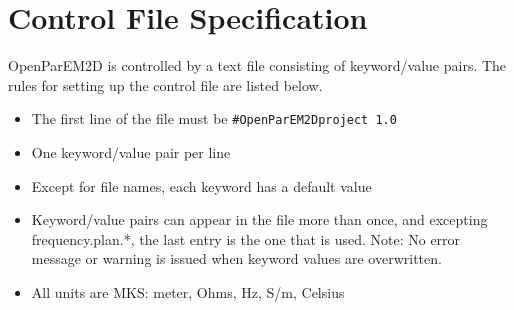 \documentclass[titlepage]{article}
\renewcommand\_{\textunderscore\linebreak[1]}
\begin{document}
\appendix

\newpage
\section{Control File Specification}
\label{sec:control_file_spec}

OpenParEM2D is controlled by a text file consisting of keyword/value pairs.  The rules for setting up the control file are listed below.
\begin{itemize}[nosep]
  \item The first line of the file must be \verb+#OpenParEM2Dproject 1.0+
  \item One keyword/value pair per line
  \item Except for file names, each keyword has a default value
  \item Keyword/value pairs can appear in the file more than once, and excepting frequency.plan.*, the last entry is the one that is used.  Note: No error message or warning is issued when keyword values are overwritten.
  \item All units are MKS: meter, Ohms, Hz, S/m, Celsius
\end{itemize}
\end{document}

